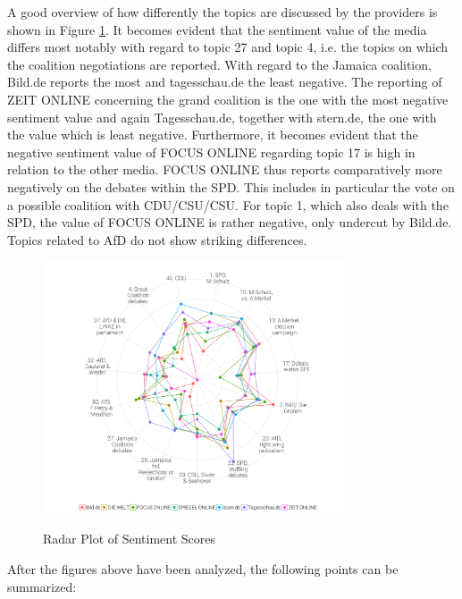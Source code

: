 \documentclass[12pt,a4paper,notitlepage]{article}
\begin{document}
A good overview of how differently the topics are discussed by the providers is shown in Figure \ref{fig_sentscore_radar}. It becomes evident that the sentiment value of the media differs most notably with regard to topic 27 and topic 4, i.e. the topics on which the coalition negotiations are reported. With regard to the Jamaica coalition, Bild.de reports the most and tagesschau.de the least negative. The reporting of ZEIT ONLINE concerning the grand coalition is the one with the most negative sentiment value and again Tagesschau.de, together with stern.de, the one with the value which is least negative. Furthermore, it becomes evident that the negative sentiment value of FOCUS ONLINE regarding topic 17 is high in relation to the other media. FOCUS ONLINE thus reports comparatively more negatively on the debates within the SPD. This includes in particular the vote on a possible coalition with CDU/CSU/CSU. For topic 1, which also deals with the SPD, the value of FOCUS ONLINE is rather negative, only undercut by Bild.de. Topics related to AfD do not show striking differences. 

\begin{figure}[H]
	\caption{Radar Plot of Sentiment Scores}
	\begin{center}
			\includegraphics[width=0.8\textwidth,keepaspectratio]{figs/sentscore_radar.png}
			\label{fig_sentscore_radar}
	\end{center}
\end{figure}

After the figures above have been analyzed, the following points can be summarized:
\end{document}
